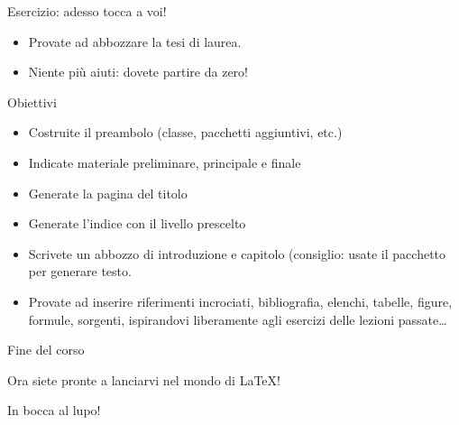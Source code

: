 \documentclass{beamer}
\begin{document}
\begin{frame}{Esercizio: adesso tocca a voi!}
\begin{itemize}
\item Provate ad abbozzare la  tesi di laurea.
\item Niente pi\`u aiuti: dovete partire da zero!
\end{itemize}

\begin{block}{Obiettivi}
\begin{itemize}
\item Costruite il preambolo (classe, pacchetti aggiuntivi, etc.)
\item Indicate  materiale preliminare, principale e finale
\item Generate la pagina del titolo
\item Generate l'indice con il livello prescelto
\item Scrivete un abbozzo di introduzione e capitolo (consiglio: usate il pacchetto  per generare testo.
\item Provate ad inserire riferimenti incrociati, bibliografia, elenchi, tabelle, figure, formule, sorgenti, ispirandovi liberamente agli esercizi delle lezioni passate\ldots
\end{itemize}
\end{block}

\end{frame}

\begin{frame}{Fine del corso}
\begin{center}
Ora siete pronte a lanciarvi nel mondo di \LaTeX{}!

In bocca al lupo!
\end{center}
\end{frame}
\end{document}
